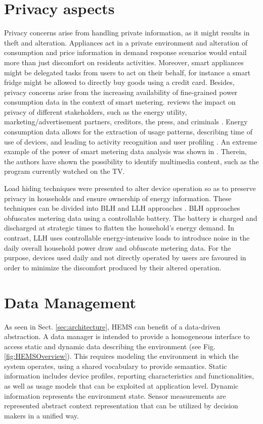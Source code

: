 \documentclass{article}
\begin{document}
\section{Privacy aspects}\label{sec:privacy}
Privacy concerns arise from handling private information, as it might results in theft and alteration.
Appliances act in a private environment and alteration of consumption and price information in demand response scenarios would entail more than just discomfort on residents activities.
Moreover, smart appliances might be delegated tasks from users to act on their behalf, for instance a smart fridge might be allowed to directly buy goods using a credit card.
Besides, privacy concerns arise from the increasing availability of fine-grained power consumption data in the context of smart metering.
\cite{MolinaMarkham2010} reviews the impact on privacy of different stakeholders, such as the energy utility, marketing/advertisement partners, creditors, the press, and criminals \cite{Skopik}.
Energy consumption data allows for the extraction of usage patterns, describing time of use of devices, and leading to activity recognition and user profiling \cite{Nguyen2013244,Lisovich2010}.
An extreme example of the power of smart metering data analysis was shown in \cite{Greveler2012}.
Therein, the authors have shown the possibility to identify multimedia content, such as the program currently watched on the TV.

Load hiding techniques were presented to alter device operation so as to preserve privacy in households and ensure ownership of energy information.
These techniques can be divided into \ac{BLH} and \ac{LLH} approaches \cite{Egarter2014}.
\ac{BLH} approaches obfuscates metering data using a controllable battery.
The battery is charged and discharged at strategic times to flatten the household’s energy demand.
In contrast, \ac{LLH} uses controllable energy-intensive loads to introduce noise in the daily overall household power draw and obfuscate metering data.
For the purpose, devices used daily and not directly operated by users are favoured in order to minimize the discomfort produced by their altered operation.

\section{Data Management}\label{sec:managementData}
As seen in Sect. \ref{sec:architecture}, \ac{HEMS} can benefit of a data-driven abstraction.
A data manager is intended to provide a homogeneous interface to access static and dynamic data describing the environment (see Fig.\ref{fig:HEMSOverview}).
This requires modeling the environment in which the system operates, using a shared vocabulary to provide semantics.
Static information includes device profiles, reporting characteristics and functionalities, as well as usage models that can be exploited at application level.
Dynamic information represents the environment state.
Sensor measurements are represented abstract context representation that can be utilized by decision makers in a unified way.
\end{document}
